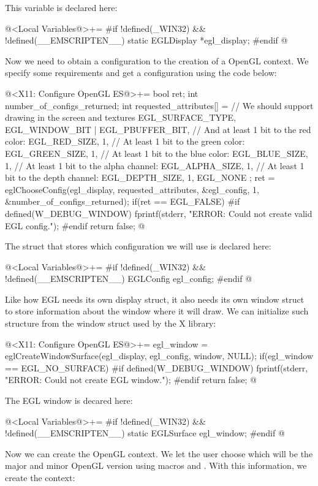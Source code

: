 This variable is declared here:

\iniciocodigo
@<Local Variables@>+=
#if !defined(_WIN32) && !defined(__EMSCRIPTEN__)
static EGLDisplay *egl_display;
#endif
@
\fimcodigo

Now we need to obtain a configuration to the creation of a OpenGL
context. We specify some requirements and get a configuration using
the code below:

\iniciocodigo
@<X11: Configure OpenGL ES@>+=
{
  bool ret;
  int number_of_configs_returned;
  int requested_attributes[] = {
    // We should support drawing in the screen and textures
    EGL_SURFACE_TYPE,  EGL_WINDOW_BIT | EGL_PBUFFER_BIT,
    // And at least 1 bit to the red color:
    EGL_RED_SIZE, 1,
    // At least 1 bit to the green color:
    EGL_GREEN_SIZE, 1,
    // At least 1 bit to the blue color:
    EGL_BLUE_SIZE, 1,
    // At least 1 bit to the alpha channel:
    EGL_ALPHA_SIZE, 1,
    // At least 1 bit to the depth channel:
    EGL_DEPTH_SIZE, 1,
    EGL_NONE
  };
  ret = eglChooseConfig(egl_display, requested_attributes,
                        &egl_config, 1, &number_of_configs_returned);
  if(ret == EGL_FALSE){
#if defined(W_DEBUG_WINDOW)
    fprintf(stderr, "ERROR: Could not create valid EGL config.\n");
#endif
    return false;
  }
}
@
\fimcodigo

The struct that stores which configuration we will use is declared
here:

\iniciocodigo
@<Local Variables@>+=
#if !defined(_WIN32) && !defined(__EMSCRIPTEN__)
EGLConfig egl_config;
#endif
@
\fimcodigo


Like how EGL needs its own display struct, it also needs its own
window struct to store information about the window where it will
draw. We can initialize such structure from the window struct used by
the X library:

\iniciocodigo
@<X11: Configure OpenGL ES@>+=
egl_window = eglCreateWindowSurface(egl_display, egl_config,
                                    window, NULL);
if(egl_window == EGL_NO_SURFACE){
#if defined(W_DEBUG_WINDOW)
  fprintf(stderr, "ERROR: Could not create EGL window.\n");
#endif
  return false;
}
@
\fimcodigo

The EGL window is decared here:

\iniciocodigo
@<Local Variables@>+=
#if !defined(_WIN32) && !defined(__EMSCRIPTEN__)
static EGLSurface egl_window;
#endif
@
\fimcodigo


Now we can create the OpenGL context. We let the user choose which
will be the major and minor OpenGL version using
macros  and
. With this information, we create the context:

